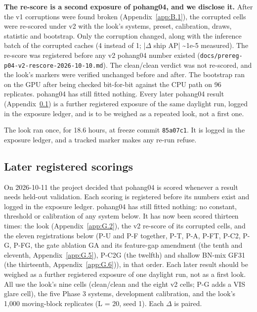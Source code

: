 \documentclass[journal,onecolumn]{IEEEtran}
\begin{document}
\textbf{The re-score is a second exposure of pohang04, and we disclose it.} After the v1 corruptions were found broken (Appendix~\ref{app:B.1}), the corrupted cells were re-scored under v2 with the look's systems, preset, calibration, draws, statistic and bootstrap. Only the corruption changed, along with the inference batch of the corrupted caches (4 instead of 1; |$\Delta$ ship AP| \textasciitilde{}1e-5 measured). The re-score was registered before any v2 pohang04 number existed (\texttt{docs/\allowbreak{}prereg-\allowbreak{}p04-\allowbreak{}v2-\allowbreak{}rescore-\allowbreak{}2026-\allowbreak{}10-\allowbreak{}10.md}). The clean/clean verdict was not re-scored, and the look's markers were verified unchanged before and after. The bootstrap ran on the GPU after being checked bit-for-bit against the CPU path on 96 replicates. pohang04 has still fitted nothing. Every later pohang04 result (Appendix~\ref{app:G.3}) is a further registered exposure of the same daylight run, logged in the exposure ledger, and is to be weighed as a repeated look, not a first one.

The look ran once, for 18.6 hours, at freeze commit \texttt{85a07c1}. It is logged in the exposure ledger, and a tracked marker makes any re-run refuse.

\subsection{Later registered scorings}\label{app:G.3}
On 2026-10-11 the project decided that pohang04 is scored whenever a result needs held-out validation. Each scoring is registered before its numbers exist and logged in the exposure ledger. pohang04 has still fitted nothing: no constant, threshold or calibration of any system below. It has now been scored thirteen times: the look (Appendix~\ref{app:G.2}), the v2 re-score of its corrupted cells, and the eleven registrations below (P-U and P-F together, P-T, P-A, P-FT, P-C2, P-G, P-FG, the gate ablation GA and its feature-gap amendment (the tenth and eleventh, Appendix~\ref{app:G.5}), P-C2G (the twelfth) and shallow BN-mix GF31 (the thirteenth, Appendix~\ref{app:G.6})), in that order. Each later result should be weighed as a further registered exposure of one daylight run, not as a first look. All use the look's nine cells (clean/clean and the eight v2 cells; P-G adds a VIS glare cell), the five Phase 3 systems, development calibration, and the look's 1,000 moving-block replicates (L = 20, seed 1). Each $\Delta$ is paired.
\end{document}
